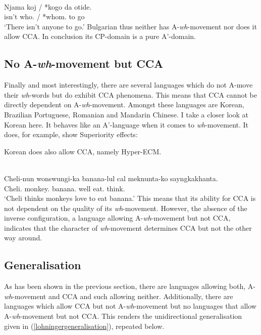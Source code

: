 \documentclass[output=paper,colorlinks,citecolor=brown]{langscibook}
\begin{document}
\ea \citep[192]{rudin21986aspects}\\
\gll Njama koj / *kogo da otide.\\
isn't who. / *whom. to go\\
\glt `There isn't anyone to go.'
\z
Bulgarian thus neither has A-\textit{wh}-movement nor does it allow CCA. In conclusion its CP-domain is a pure A'-domain. 



\subsection{No A-\textit{wh}-movement but CCA}
Finally and most interestingly, there are several languages which do not A-move their \textit{wh}-words but do exhibit CCA phenomena. This means that CCA cannot be directly dependent on A-\textit{wh}-movement. Amongst these languages are Korean, Brazilian Portuguese, Romanian and Mandarin Chinese. I take a closer look at Korean here. It behaves like an A'-language when it comes to \textit{wh}-movement. It does, for example, show Superiority effects:

\ea \citep[131]{jeong2003deriving}
\z 
\z
Korean does also allow CCA, namely Hyper-ECM.

\ea \citep[630]{yoon2007raising}\\
\gll Cheli-nun wonswungi-ka banana-lul cal meknunta-ko sayngkakhanta.\\
Cheli. monkey. banana. well eat. think.\\
\glt `Cheli thinks monkeys love to eat banana.’
\z
This means that its ability for CCA is not dependent on the quality of its \textit{wh}-movement. However, the absence of the inverse configuration, a language allowing A-\textit{wh}-movement but not CCA, indicates that the character of \textit{wh}-movement determines CCA but not the other way around.

\subsection{Generalisation}
As has been shown in the previous section, there are languages allowing both, A-\textit{wh}-movement and CCA and such allowing neither. Additionally, there are languages which allow CCA but not A-\textit{wh}-movement but no languages that allow A-\textit{wh}-movement but not CCA. This renders the unidirectional generalisation given in (\ref{lohningergeneralisation}), repeated below.
\end{document}
